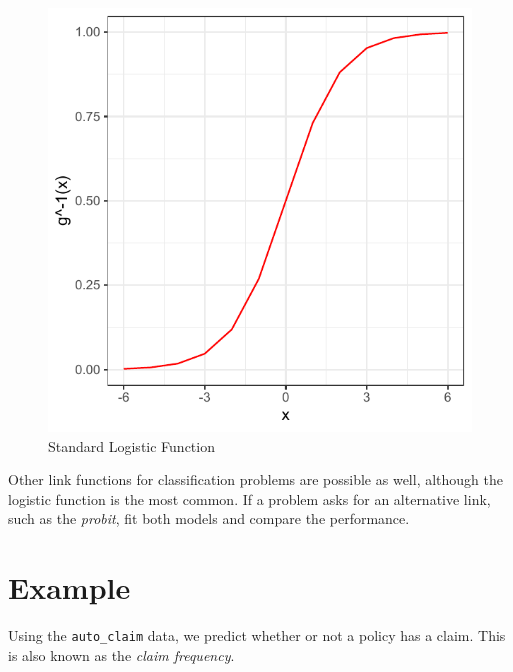 \documentclass[openany]{book}
\newenvironment{Shaded}{\begin{snugshade}}{\end{snugshade}}
\newcommand{\KeywordTok}[1]{\textcolor[rgb]{0.13,0.29,0.53}{\textbf{#1}}}
\newcommand{\NormalTok}[1]{#1}
\newcommand{\OperatorTok}[1]{\textcolor[rgb]{0.81,0.36,0.00}{\textbf{#1}}}
\newcommand{\StringTok}[1]{\textcolor[rgb]{0.31,0.60,0.02}{#1}}
\begin{document}
\begin{figure}

{\centering \includegraphics{05-linear-models_files/figure-latex/unnamed-chunk-25-1} 

}

\caption{Standard Logistic Function}\label{fig:unnamed-chunk-25}
\end{figure}

Other link functions for classification problems are possible as well, although the logistic function is the most common. If a problem asks for an alternative link, such as the \emph{probit}, fit both models and compare the performance.

\hypertarget{example-2}{%
\section{Example}\label{example-2}}

Using the \texttt{auto\_claim} data, we predict whether or not a policy has a claim. This is also known as the \emph{claim frequency}.

\begin{Shaded}
\end{Shaded}
\end{document}
